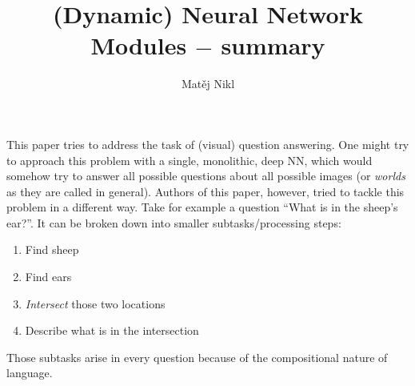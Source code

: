 \documentclass[a4paper,twocolumn]{article}
\title{(Dynamic) Neural Network Modules $-$ summary}
\author{Matěj Nikl}
\begin{document}
\maketitle
\noindent
This paper tries to address the task of (visual) question answering. One might try to approach this problem with a single, monolithic, deep NN, which would somehow try to answer all possible questions about all possible images (or \textit{worlds} as they are called in general). Authors of this paper, however, tried to tackle this problem in a different way. Take for example a question ``What is in the sheep's ear?''. It can be broken down into smaller subtasks/processing steps:
    \begin{enumerate}
        \item Find sheep
        \item Find ears
        \item \textit{Intersect} those two locations
        \item Describe what is in the intersection
    \end{enumerate}
Those subtasks arise in every question because of the compositional nature of language.
\end{document}

